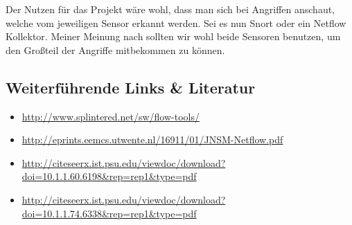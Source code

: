 Der Nutzen für das Projekt wäre wohl, dass man sich bei Angriffen
anschaut, welche vom jeweiligen Sensor erkannt werden. Sei es nun Snort
oder ein Netflow Kollektor. Meiner Meinung nach sollten wir wohl beide
Sensoren benutzen, um den Großteil der Angriffe mitbekommen zu können.

\subsection{Weiterführende Links \& Literatur}

\begin{itemize}
  \item \url{http://www.splintered.net/sw/flow-tools/}
  \item \url{http://eprints.eemcs.utwente.nl/16911/01/JNSM-Netflow.pdf}
  \item \url{http://citeseerx.ist.psu.edu/viewdoc/download?doi=10.1.1.60.6198&rep=rep1&type=pdf}
  \item \url{http://citeseerx.ist.psu.edu/viewdoc/download?doi=10.1.1.74.6338&rep=rep1&type=pdf}
\end{itemize}
